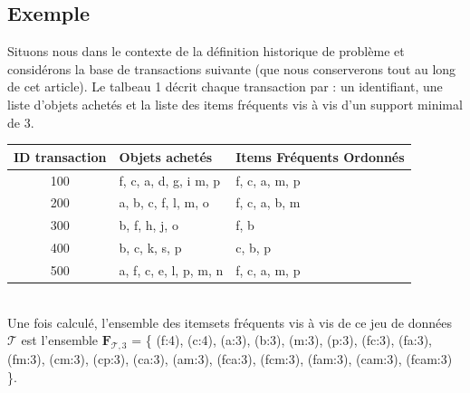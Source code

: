 \documentclass[a4paper,10pt]{report}
\begin{document}
\subsection{Exemple}
	Situons nous dans le contexte de la définition historique de problème et considérons la base de transactions suivante (que nous conserverons tout au long de cet article). Le talbeau 1 décrit chaque transaction par : un identifiant, une liste d'objets achetés et la liste des items fréquents vis à vis d'un support minimal de  3.\\

\begin{tabular}{|c|l|l|}
	\hline
	ID transaction & Objets achetés & Items Fréquents Ordonnés \\
	\hline
	100 & f, c, a, d, g, i m, p & f, c, a, m, p \\
	\hline
	200 & a, b, c, f, l, m, o & f, c, a, b, m \\
	\hline
	300 & b, f, h, j, o & f, b \\
	\hline
	400 & b, c, k, s, p & c, b, p \\
	\hline
	500 & a, f, c, e, l, p, m, n & f, c, a, m, p \\
	\hline	
\end{tabular}
\vspace{0.4cm}
\\
\hspace{0.15cm}Une fois calculé, l'ensemble des itemsets fréquents vis à vis de ce jeu de données $\mathcal{T}$ est l'ensemble $\textbf{F}_{\mathcal{T},3}$ = \{ (f:4), (c:4), (a:3), (b:3), (m:3), (p:3), (fc:3), (fa:3), (fm:3), (cm:3), (cp:3), (ca:3), (am:3), (fca:3), (fcm:3), (fam:3), (cam:3), (fcam:3) \}.  \\
\end{document}
